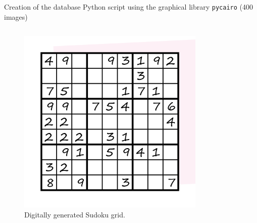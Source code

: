 \documentclass[12pt, dvipsnames]{beamer}
\begin{document}
\begin{frame}{Creation of the database}
    Python script using the graphical library \texttt{pycairo} (\alert{400} images)
    \begin{columns}
        \begin{figure}
            \centering
            \includegraphics[width=0.8\textwidth]{resources/sudoku/sudoku_0025.png}
            \caption{Digitally generated Sudoku grid.}
        \end{figure}
        
    \end{columns}
\end{frame}
\end{document}
